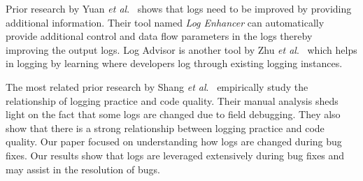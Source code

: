 Prior research by Yuan\textsl{ et al$ . $}~\cite{Yuan} shows that logs need to be improved by providing additional information. Their tool named \emph{Log Enhancer} can automatically provide additional control and data flow parameters in the logs thereby improving the output logs. Log Advisor is another tool by Zhu \emph{et al$.$}~\cite{zhu2015learning} which helps in logging by learning where developers log through existing logging instances. 

The most related prior research by Shang \emph{et al$.$}~\cite{EMSEIAN} empirically study the relationship of logging practice and code quality. Their manual analysis sheds light on the fact that some logs are changed due to field debugging. They also show that there is a strong relationship between logging practice and code quality. Our paper focused on understanding how logs are changed during bug fixes. Our results show that logs are leveraged extensively during bug fixes and may assist in the resolution of bugs. 

